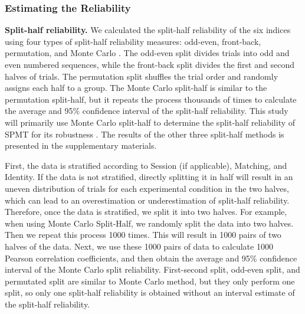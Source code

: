 \documentclass[sn-apa]{sn-jnl}%
\theoremstyle{thmstyleone}%
\theoremstyle{thmstyletwo}%
\theoremstyle{thmstylethree}%
\begin{document}
\subsubsection{Estimating the Reliability}\label{subsubsec:reliability}
\textbf{Split-half reliability.} We calculated the split-half reliability of the six indices using four types of split-half reliability measures: odd-even, front-back, permutation, and Monte Carlo \parencite{kahveci2022reliability,pronk2022methods}. The odd-even split divides trials into odd and even numbered sequences, while the front-back split divides the first and second halves of trials. The permutation split shuffles the trial order and randomly assigns each half to a group. The Monte Carlo split-half is similar to the permutation split-half, but it repeats the process thousands of times to calculate the average and 95\% confidence interval of the split-half reliability. This study will primarily use Monte Carlo split-half to determine the split-half reliability of SPMT for its robustness \parencite{pronk2022methods}. The results of the other three split-half methods is presented in the supplementary materials.

First, the data is stratified according to Session (if applicable), Matching, and Identity. If the data is not stratified, directly splitting it in half will result in an uneven distribution of trials for each experimental condition in the two halves, which can lead to an overestimation or underestimation of split-half reliability. Therefore, once the data is stratified, we split it into two halves. For example, when using Monte Carlo Split-Half, we randomly split the data into two halves. Then we repeat this process 1000 times. This will result in 1000 pairs of two halves of the data. Next, we use these 1000 pairs of data to calculate 1000 Pearson correlation coefficients, and then obtain the average and 95\% confidence interval of the Monte Carlo split reliability. First-second split, odd-even split, and permutated split are similar to Monte Carlo method, but they only perform one split, so only one split-half reliability is obtained without an interval estimate of the split-half reliability.
\end{document}
